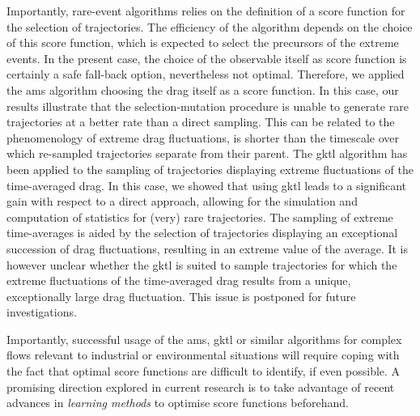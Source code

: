 \documentclass{jfm}
\newcommand{\EL}[1]{{\color{myred}{#1}}}
\begin{document}
Importantly, rare-event algorithms relies on the definition of a score function for the selection of trajectories. The efficiency of the algorithm depends on the choice of this score function, which is expected to select the precursors of the extreme events.  
In the present case, the choice of the observable itself as score function is certainly a safe fall-back option, nevertheless not optimal.
%
Therefore, we applied the \ac{ams} algorithm choosing the drag itself as a score function.
In this case, our results illustrate that the selection-mutation procedure is unable to generate rare trajectories at a better rate than a direct sampling.
This can be related to the phenomenology of extreme drag fluctuations, \EL{whose lifetime} is shorter than the timescale over which re-sampled trajectories separate from their parent. 
The \ac{gktl} algorithm has been applied to the sampling of trajectories displaying extreme fluctuations of the time-averaged drag.
In this case, we showed that using \ac{gktl} leads to a significant gain with respect to a direct approach, allowing for the simulation and computation of statistics for (very) rare trajectories.
The sampling of extreme time-averages is aided by the selection of trajectories displaying an exceptional succession of drag fluctuations, resulting in an extreme value of the average.
It is however unclear whether the \ac{gktl} is suited to sample trajectories for which the extreme fluctuations of the time-averaged drag results from a unique, exceptionally large drag fluctuation. This issue is postponed for future investigations.

Importantly, successful usage of the \ac{ams}, \ac{gktl} or similar algorithms for complex flows relevant to industrial or environmental situations will require coping with the fact that optimal score functions
are difficult to identify, if even possible.
A promising direction explored in current research is to take advantage of recent advances in \emph{learning methods} to optimise score functions beforehand.
\end{document}
